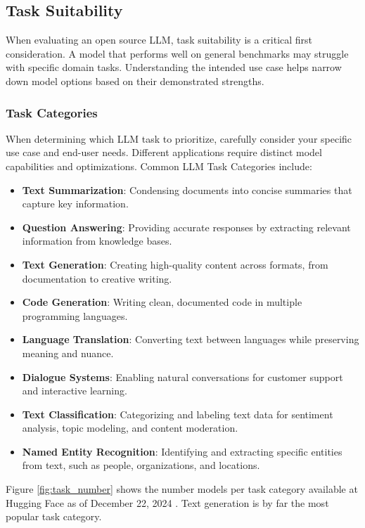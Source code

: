 \subsection{Task Suitability}

When evaluating an open source LLM, task suitability is a critical first consideration. A model that performs well on general benchmarks may struggle with specific domain tasks. Understanding the intended use case helps narrow down model options based on their demonstrated strengths.

\subsubsection{Task Categories}

When determining which LLM task to prioritize, carefully consider your specific use case and end-user needs. Different applications require distinct model capabilities and optimizations. Common LLM Task Categories include:
\begin{itemize}
    \item \textbf{Text Summarization}: Condensing documents into concise summaries that capture key information.
    \item \textbf{Question Answering}: Providing accurate responses by extracting relevant information from knowledge bases.
    \item \textbf{Text Generation}: Creating high-quality content across formats, from documentation to creative writing.
    \item \textbf{Code Generation}: Writing clean, documented code in multiple programming languages.
    \item \textbf{Language Translation}: Converting text between languages while preserving meaning and nuance.
    \item \textbf{Dialogue Systems}: Enabling natural conversations for customer support and interactive learning.
    \item \textbf{Text Classification}: Categorizing and labeling text data for sentiment analysis, topic modeling, and content moderation.
    \item \textbf{Named Entity Recognition}: Identifying and extracting specific entities from text, such as people, organizations, and locations.
\end{itemize}

Figure \ref{fig:task_number} shows the number models per task category available at Hugging Face as of December 22, 2024 . Text generation is by far the most popular task category.

